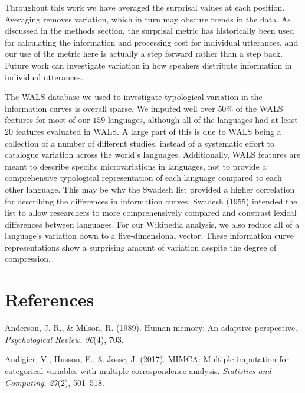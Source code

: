 \documentclass[man,floatsintext]{apa6}
\begin{document}
Throughout this work we have averaged the surprisal values at each position. Averaging removes variation, which in turn may obscure trends in the data. As discussed in the methods section, the surprisal metric has historically been used for calculating the information and processing cost for individual utterances, and our use of the metric here is actually a step forward rather than a step back. Future work can investigate variation in how speakers distribute information in individual utterances.

The WALS database we used to investigate typological variation in the information curves is overall sparse. We imputed well over \(50\%\) of the WALS features for most of our \(159\) languages, although all of the languages had at least \(20\) features evaluated in WALS. A large part of this is due to WALS being a collection of a number of different studies, instead of a systematic effort to catalogue variation across the world's languages. Additionally, WALS features are meant to describe specific microvariations in languages, not to provide a comprehensive typological representation of each language compared to each other language. This may be why the Swadesh list provided a higher correlation for describing the differences in information curves: Swadesh (1955) intended the list to allow researchers to more comprehensively compared and constrast lexical differences between languages. For our Wikipedia analysis, we also reduce all of a language's variation down to a five-dimensional vector. These information curve representations show a surprising amount of variation despite the degree of compression.

\newpage

\hypertarget{references}{%
\section{References}\label{references}}

\begingroup
\setlength{\parindent}{-0.5in}
\setlength{\leftskip}{0.5in}

\hypertarget{refs}{}
\leavevmode\hypertarget{ref-anderson1989}{}%
Anderson, J. R., \& Milson, R. (1989). Human memory: An adaptive perspective. \emph{Psychological Review}, \emph{96}(4), 703.

\leavevmode\hypertarget{ref-audigier2017}{}%
Audigier, V., Husson, F., \& Josse, J. (2017). MIMCA: Multiple imputation for categorical variables with multiple correspondence analysis. \emph{Statistics and Computing}, \emph{27}(2), 501--518.
\end{document}
